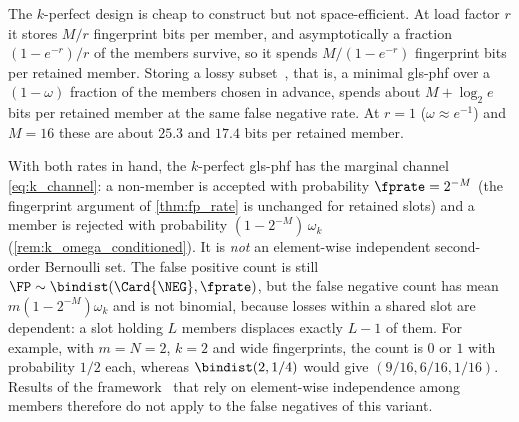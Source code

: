 \documentclass[ ../main.tex]{subfiles}
\begin{document}
\begin{remark}
\label{rem:kperfect_space}
The $k$-perfect design is cheap to construct but not space-efficient. At load factor $r$ it stores $M/r$ fingerprint bits per member, and asymptotically a fraction $(1-e^{-r})/r$ of the members survive, so it spends $M/(1 - e^{-r})$ fingerprint bits per retained member. Storing a lossy subset~\cite{pagh2001lossy}, that is, a minimal \gls{gls-phf} over a $(1-\omega)$ fraction of the members chosen in advance, spends about $M + \log_2 e$ bits per retained member at the same false negative rate. At $r = 1$ ($\omega \approx e^{-1}$) and $M = 16$ these are about $25.3$ and $17.4$ bits per retained member.
\end{remark}

With both rates in hand, the $k$-perfect \gls{gls-phf} has the marginal channel \cref{eq:k_channel}: a non-member is accepted with probability $\fprate = 2^{-M}$ (the fingerprint argument of \cref{thm:fp_rate} is unchanged for retained slots) and a member is rejected with probability $(1-2^{-M})\,\omega_k$ (\cref{rem:k_omega_conditioned}). It is \emph{not} an element-wise independent second-order Bernoulli set. The false positive count is still $\FP \sim \bindist(\Card{\NEG}, \fprate)$, but the false negative count has mean $m(1-2^{-M})\omega_k$ and is not binomial, because losses within a shared slot are dependent: a slot holding $L$ members displaces exactly $L - 1$ of them. For example, with $m = N = 2$, $k = 2$ and wide fingerprints, the count is $0$ or $1$ with probability $1/2$ each, whereas $\bindist(2, 1/4)$ would give $(9/16, 6/16, 1/16)$. Results of the framework~\cite{bsets,emaps} that rely on element-wise independence among members therefore do not apply to the false negatives of this variant.
\end{document}
